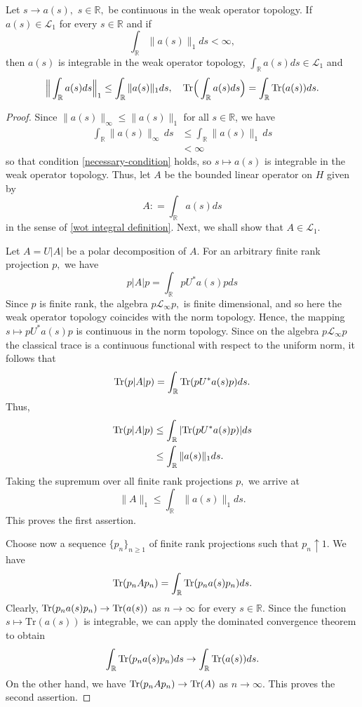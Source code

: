     \begin{lem}\label{peter lemma} Let $s\to a(s),$ $s\in\mathbb{R},$ be continuous in the weak operator topology. If $a(s)\in\mathcal{L}_1$ for every $s\in\mathbb{R}$ and if
        $$\int_{\mathbb{R}}\|a(s)\|_1ds<\infty,$$
        then $a(s)$ is integrable in the weak operator topology, $\int_{\mathbb{R}}a(s)ds \in \mathcal{L}_1$ and
        $$\Big\|\int_{\mathbb{R}}a(s)ds\Big\|_1\leq\int_{\mathbb{R}}\|a(s)\|_1ds,\quad {\rm Tr}\Big(\int_{\mathbb{R}}a(s)ds\Big)=\int_{\mathbb{R}}{\rm Tr}(a(s))ds.$$
    \end{lem}
    \begin{proof}
        Since $\|a(s)\|_\infty \leq \|a(s)\|_{1}$ for all $s \in \mathbb{R}$, we have
        \begin{align*}
            \int_{\mathbb{R}} \|a(s)\|_\infty \,ds &\leq \int_{\mathbb{R}} \|a(s)\|_{1}\,ds\\
                                            &< \infty
        \end{align*}
        so that condition \eqref{necessary-condition} holds, so $s\mapsto a(s)$ is integrable in the weak operator topology. Thus, { let $A$ be the bounded linear
        operator on $H$ given by
        $$A : =\int_{\mathbb{R}}a(s)ds$$
        in the sense of \eqref{wot integral definition}. Next, we shall show that $A \in \mathcal{L}_1$.}

        Let $A=U|A|$ be a polar decomposition of $A$. 
        For an arbitrary finite rank projection $p,$ we have
        $$p|A|p=\int_{\mathbb{R}}pU^*a(s)pds$$
        Since $p$ is finite rank, the algebra $p\mathcal{L}_{\infty}p,$ is finite dimensional, and so here the weak operator topology coincides with the norm topology. 
        Hence, the mapping $s\mapsto pU^*a(s)p$ is continuous in the norm topology. Since on the algebra $p\mathcal{L}_{\infty}p$ the classical trace is a continuous functional with respect to the uniform norm, it follows that
        $${\rm Tr}(p|A|p)=\int_{\mathbb{R}}{\rm Tr}(pU^*a(s)p)ds.$$
        Thus,
        \begin{align*}
            {\rm Tr}(p|A|p) &\leq \int_{\mathbb{R}}|{\rm Tr}(pU^*a(s)p)|ds\\
                            &\leq \int_{\mathbb{R}}\|a(s)\|_1ds.
        \end{align*}
        Taking the supremum over all finite rank projections $p,$ we arrive at
        $$\|A\|_1\leq\int_{\mathbb{R}}\|a(s)\|_1ds.$$
        This proves the first assertion.

        Choose now a sequence $\{p_n\}_{n\geq1}$ of finite rank projections such that $p_n\uparrow 1.$ 
        We have
        $${\rm Tr}(p_nAp_n)=\int_{\mathbb{R}}{\rm Tr}(p_na(s)p_n)ds.$$
        Clearly, ${\rm Tr}(p_na(s)p_n)\to{\rm Tr}(a(s))$ as $n\to\infty$ for every $s\in\mathbb{R}.$ Since the function $s \mapsto \mathrm{Tr}(a(s))$ is integrable, we can apply the dominated convergence theorem to obtain
        $$\int_{\mathbb{R}}{\rm Tr}(p_na(s)p_n)ds\to\int_{\mathbb{R}}{\rm Tr}(a(s))ds.$$
        On the other hand, we have ${\rm Tr}(p_nAp_n)\to{\rm Tr}(A)$ as $n\to\infty.$ This proves the second assertion.
    \end{proof}
    
